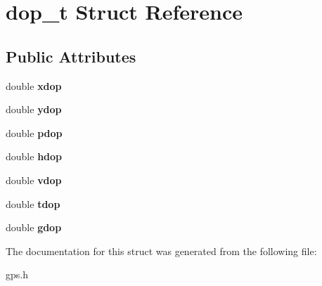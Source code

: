 \hypertarget{structdop__t}{\section{dop\-\_\-t \-Struct \-Reference}
\label{structdop__t}
}
\subsection*{\-Public \-Attributes}
\begin{DoxyCompactItemize}
\item 
\hypertarget{structdop__t_ad8447020af8336dff2f5dcb37e3a8735}{double {\bfseries xdop}}\label{structdop__t_ad8447020af8336dff2f5dcb37e3a8735}

\item 
\hypertarget{structdop__t_a3da6cba7261c353df5330228b521f059}{double {\bfseries ydop}}\label{structdop__t_a3da6cba7261c353df5330228b521f059}

\item 
\hypertarget{structdop__t_a1f134cf98a55c03b935c3433446da29c}{double {\bfseries pdop}}\label{structdop__t_a1f134cf98a55c03b935c3433446da29c}

\item 
\hypertarget{structdop__t_a4c5caa503295aafbff4019adb8819160}{double {\bfseries hdop}}\label{structdop__t_a4c5caa503295aafbff4019adb8819160}

\item 
\hypertarget{structdop__t_ab2507c6e701f463c9073c87b40bdae9e}{double {\bfseries vdop}}\label{structdop__t_ab2507c6e701f463c9073c87b40bdae9e}

\item 
\hypertarget{structdop__t_aab40e32485dd80bf5dcffc9704a5a885}{double {\bfseries tdop}}\label{structdop__t_aab40e32485dd80bf5dcffc9704a5a885}

\item 
\hypertarget{structdop__t_ade6a03d98aea4fb4d58a411c453bbd78}{double {\bfseries gdop}}\label{structdop__t_ade6a03d98aea4fb4d58a411c453bbd78}

\end{DoxyCompactItemize}


\-The documentation for this struct was generated from the following file\-:\begin{DoxyCompactItemize}
\item 
gps.\-h\end{DoxyCompactItemize}
